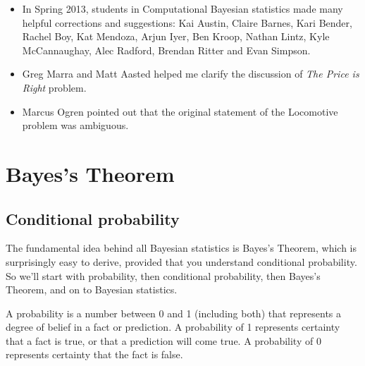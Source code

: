 \documentclass[12pt]{book}
\begin{document}
\begin{itemize}
\item In Spring 2013, students in Computational Bayesian statistics
  made many helpful corrections and suggestions: Kai Austin, Claire
  Barnes, Kari Bender, Rachel Boy, Kat Mendoza, Arjun Iyer, Ben Kroop,
  Nathan Lintz, Kyle McCannaughay, Alec Radford, Brendan Ritter and
  Evan Simpson.

\item Greg Marra and Matt Aasted helped me clarify the discussion of
  {\it The Price is Right} problem.

\item Marcus Ogren pointed out that the original statement of the
  Locomotive problem was ambiguous.


\end{itemize}

\normalsize

\clearemptydoublepage

\begin{latexonly}

\tableofcontents

\clearemptydoublepage

\end{latexonly}

\mainmatter

\newcommand{\p}[1]{\ensuremath{\mathrm{p}(#1)}}
\renewcommand{\o}[1]{\ensuremath{\mathrm{o}(#1)}}
\newcommand{\T}[1]{\mbox{#1}}
\newcommand{\AND}{~\mathrm{and}~}
\newcommand{\NOT}{\mathrm{not}~}


\chapter{Bayes's Theorem}
\label{intro}

\section{Conditional probability}

The fundamental idea behind all Bayesian statistics is Bayes's Theorem,
which is surprisingly easy to derive, provided that you understand
conditional probability.  So we'll start with probability, then
conditional probability, then Bayes's Theorem, and on to Bayesian
statistics.

A probability is a number between 0 and 1 (including both) that
represents a degree of belief in a fact or prediction.  A probability
of 1 represents certainty that a fact is true, or that a prediction
will come true.  A probability of 0 represents certainty
that the fact is false.
\end{document}
